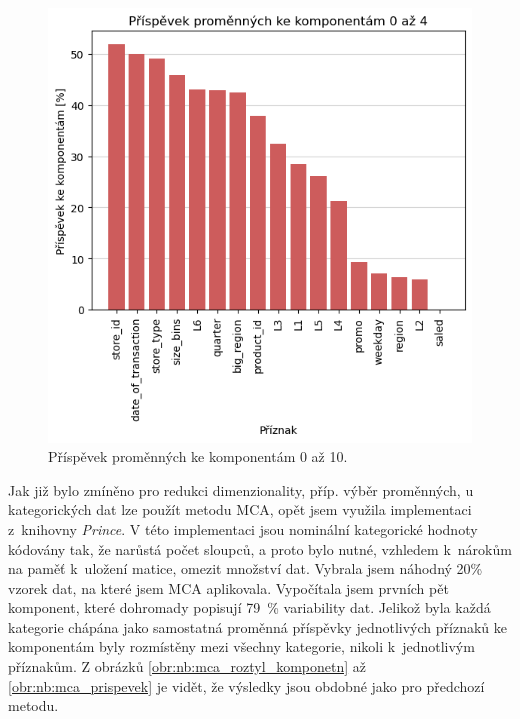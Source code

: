 \begin{figure}[h!]
    \centering
    \includegraphics[width=.6\textwidth]{obrazky/pripravadat/pca-prispevky.png}
    \caption{Příspěvek proměnných ke komponentám 0 až 10.}
    \label{obr:nb:pca_prispevek}
\end{figure}
    
Jak již bylo zmíněno pro redukci dimenzionality, příp. výběr proměnných, u kategorických dat lze použít metodu MCA, opět jsem využila implementaci z~knihovny \emph{Prince}. 
V této implementaci jsou nominální kategorické hodnoty kódovány tak, že narůstá počet sloupců, a proto bylo nutné, vzhledem k~nárokům na paměť k~uložení matice, omezit množství dat. 
Vybrala jsem náhodný 20\% vzorek dat, na které jsem MCA aplikovala. Vypočítala jsem prvních pět komponent, které dohromady popisují 79~\% variability dat. Jelikož byla každá kategorie chápána jako samostatná proměnná příspěvky jednotlivých příznaků ke komponentám byly rozmístěny mezi všechny kategorie, nikoli k~jednotlivým příznakům. 
Z obrázků \ref*{obr:nb:mca_roztyl_komponetn} až \ref*{obr:nb:mca_prispevek} je vidět, že výsledky jsou obdobné jako pro předchozí metodu.

